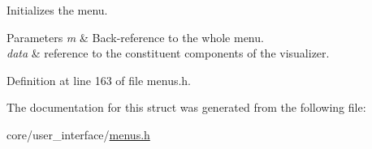 Initializes the menu. 


\begin{DoxyParams}{Parameters}
{\em m} & Back-\/reference to the whole menu. \\
\hline
{\em data} & reference to the constituent components of the visualizer. \\
\hline
\end{DoxyParams}


Definition at line 163 of file menus.\+h.



The documentation for this struct was generated from the following file\+:\begin{DoxyCompactItemize}
\item 
core/user\+\_\+interface/\hyperlink{menus_8h}{menus.\+h}\end{DoxyCompactItemize}
